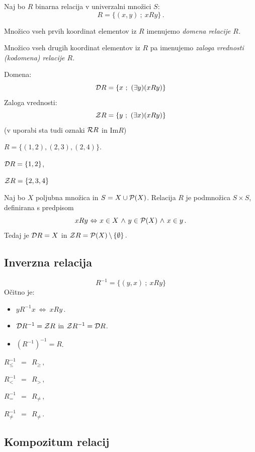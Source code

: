 \documentclass[11pt,paper=b5,DIV=13,headinclude,footinclude]{scrbook}
\newcounter{example}
\def\inn {{~\wedge~}}
\def\brez {{\,\setminus\,}}
\def\cee {{~\Leftrightarrow~}}
\begin{document}
Naj bo $R$ binarna relacija v univerzalni množici $S$:
$$R = \{(x,y)~;~xRy\}\,.$$

Množico vseh prvih koordinat elementov iz $R$ imenujemo {\em domena relacije $R$.}

Množico vseh drugih koordinat elementov iz $R$ pa imenujemo {\em zaloga vrednosti (kodomena) relacije $R$.}

Domena: $${\cal D}R = \{x~;~(\exists y)(xRy)\}$$
Zaloga vrednosti: $${\cal Z}R = \{y~;~(\exists x)(xRy)\}$$
(v uporabi sta tudi oznaki ${\cal R} R$ in $\textrm{Im} R$)

\medskip

\begin{example*}

$R = \{(1,2), (2,3), (2,4)\}$.

${\cal D}R = \{1,2\}$,

${\cal Z}R = \{2,3,4\}$

\end{example*}

 \begin{example*}
Naj bo $X$ poljubna množica in $S = X\cup {\cal P}(X)$. Relacija $R$ je podmnožica $S\times S$, definirana s predpisom
$$xRy\cee x\in X\inn y\in {\cal P}(X) \inn x\in y\,.$$
Tedaj je ${\cal D}R = X$ in ${\cal Z}R = {\cal P}(X)\brez \{\emptyset\}\,.$
\end{example*}


\subsection{ Inverzna relacija}
$$R^{-1}= \{(y,x)~;~xRy\}$$
Očitno je:
\begin{itemize}
  \item $yR^{-1}x \cee xRy\,.$
  \item ${\cal D}R^{-1} = {\cal Z}R$ in ${\cal Z}R^{-1} = {\cal D}R$.
    \item $(R^{-1})^{-1} = R$.
\end{itemize}


\bigskip
\begin{example*}

 $R_\le^{-1}~~=~~R_\ge\,,$

 $R_<^{-1}~~=~~R_>\,,$

 $R_=^{-1}~~=~~R_{\neq}\,,$


$R_{\neq}^{-1}~~=~~R_{\neq}\,.$\end{example*}


\subsection{Kompozitum relacij}
\end{document}

